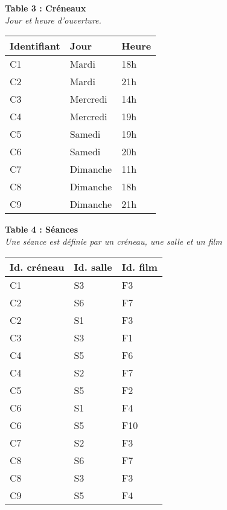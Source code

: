 \documentclass[class=report,crop=false, 12pt]{standalone}
\begin{document}
%
{\footnotesize
\begin{minipage}{0.4\textwidth}

\textbf{Table 3 : Créneaux}\\
\emph{Jour et heure d'ouverture.} \\

\begin{tabular}{|l|l|l|} \hline
\textbf{Identifiant} & \textbf{Jour} & \textbf{Heure} \\ \hline\hline
C1 & Mardi & 18h \\ \hline
C2 & Mardi & 21h \\ \hline
C3 & Mercredi & 14h \\ \hline
C4 & Mercredi & 19h \\ \hline
C5 & Samedi & 19h \\ \hline
C6 & Samedi & 20h \\ \hline
C7 & Dimanche & 11h \\ \hline
C8 & Dimanche & 18h \\ \hline
C9 & Dimanche & 21h \\ \hline
\end{tabular}
\end{minipage}
%
%
\begin{minipage}{0.4\textwidth}

\textbf{Table 4 : Séances}\\
\emph{Une séance est définie par un créneau, une salle et un film} \\

\begin{tabular}{|l|l|l|} \hline
\textbf{Id. créneau} & \textbf{Id. salle} & \textbf{Id. film} \\ \hline\hline
C1 & S3 & F3 \\ \hline
C2 & S6 & F7 \\ \hline
C2 & S1 & F3 \\ \hline
C3 & S3 & F1 \\ \hline
C4 & S5 & F6 \\ \hline
C4 & S2 & F7 \\ \hline
C5 & S5 & F2 \\ \hline
C6 & S1 & F4 \\ \hline
C6 & S5 & F10 \\ \hline
C7 & S2 & F3 \\ \hline
C8 & S6 & F7 \\ \hline
C8 & S3 & F3 \\ \hline
C9 & S5 & F4 \\ \hline
\end{tabular}
\end{minipage}
}
\end{document}
